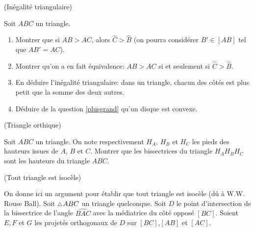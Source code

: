 \documentclass[a4paper,11pt,reqno]{amsart}
\begin{document}
\begin{exo} (Inégalité triangulaire)

  Soit $ABC$ un triangle.
  \begin{enumerate}
    \item \label{plusgrand} Montrer que si $AB > AC$, alors $\widehat{C}>\widehat{B}$ (on pourra considérer $B' \in [AB]$ tel que $AB'=AC$). %
    \item Montrer qu'on a en fait équivalence: $AB>AC$ si et seulement si $\widehat{C}>\widehat{B}$.
    \item En déduire l'inégalité triangulaire: dans un triangle, chacun des côtés est plus petit que la somme des deux autres.
    \item Déduire de la question \ref{plusgrand} qu'un disque est convexe.
  \end{enumerate}
\end{exo}


\begin{exo} (Triangle orthique)

  Soit $ABC$ un triangle. On note respectivement $H_A$, $H_B$ et $H_C$ les pieds des hauteurs issues de $A$, $B$ et $C$. Montrer que les bissectrices du triangle $H_AH_BH_C$ sont les hauteurs du triangle $ABC$.
\end{exo}

\begin{exo} (Tout triangle est isocèle)

  On donne ici un argument pour établir que tout triangle est isocèle (dû à W.W. Rouse Ball).
  Soit $\tri ABC$ un triangle quelconque. Soit $D$ le point d'intersection de la bissectrice de l'angle $\widehat{BAC}$ avec la médiatrice du côté opposé $[BC]$. Soient $E,F$ et $G$ les projetés orthogonaux de $D$ sur $[BC]$,$[AB]$ et $[AC]$.\baselineskip
\end{exo}
\end{document}
